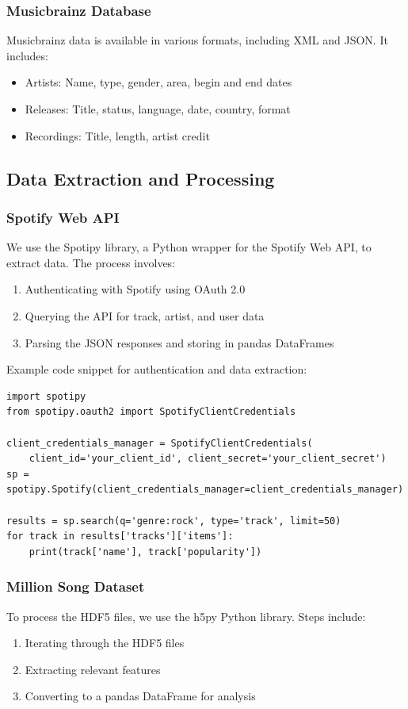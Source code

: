 \documentclass[runningheads]{llncs}
\begin{document}
\subsubsection{Musicbrainz Database}
Musicbrainz data is available in various formats, including XML and JSON. It includes:
\begin{itemize}
    \item Artists: Name, type, gender, area, begin and end dates
    \item Releases: Title, status, language, date, country, format
    \item Recordings: Title, length, artist credit
\end{itemize}

\subsection{Data Extraction and Processing}
\subsubsection{Spotify Web API}
We use the Spotipy library, a Python wrapper for the Spotify Web API, to extract data. The process involves:
\begin{enumerate}
    \item Authenticating with Spotify using OAuth 2.0
    \item Querying the API for track, artist, and user data
    \item Parsing the JSON responses and storing in pandas DataFrames
\end{enumerate}

Example code snippet for authentication and data extraction:

\begin{verbatim}
import spotipy
from spotipy.oauth2 import SpotifyClientCredentials

client_credentials_manager = SpotifyClientCredentials(
    client_id='your_client_id', client_secret='your_client_secret')
sp = spotipy.Spotify(client_credentials_manager=client_credentials_manager)

results = sp.search(q='genre:rock', type='track', limit=50)
for track in results['tracks']['items']:
    print(track['name'], track['popularity'])
\end{verbatim}

\subsubsection{Million Song Dataset}
To process the HDF5 files, we use the h5py Python library. Steps include:
\begin{enumerate}
    \item Iterating through the HDF5 files
    \item Extracting relevant features
    \item Converting to a pandas DataFrame for analysis
\end{enumerate}
\end{document}
